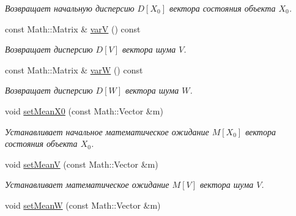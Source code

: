 \begin{DoxyCompactItemize}
\begin{DoxyCompactList}\small\item\em Возвращает начальную дисперсию $D[X_0]$ вектора состояния объекта $X_0$. \end{DoxyCompactList}\item 
\hypertarget{class_core_1_1_task_ae1f2edae174e815a622182cf82df68e6}{}\label{class_core_1_1_task_ae1f2edae174e815a622182cf82df68e6} 
const Math\+::\+Matrix \& \hyperlink{class_core_1_1_task_ae1f2edae174e815a622182cf82df68e6}{varV} () const
\begin{DoxyCompactList}\small\item\em Возвращает дисперсию $D[V]$ вектора шума $V$. \end{DoxyCompactList}\item 
\hypertarget{class_core_1_1_task_a5470510a5879a73ddde3f78ffeefe76f}{}\label{class_core_1_1_task_a5470510a5879a73ddde3f78ffeefe76f} 
const Math\+::\+Matrix \& \hyperlink{class_core_1_1_task_a5470510a5879a73ddde3f78ffeefe76f}{varW} () const
\begin{DoxyCompactList}\small\item\em Возвращает дисперсию $D[W]$ вектора шума $W$. \end{DoxyCompactList}\item 
\hypertarget{class_core_1_1_task_afdd5722479df7ff461d797b1b51ee9bf}{}\label{class_core_1_1_task_afdd5722479df7ff461d797b1b51ee9bf} 
void \hyperlink{class_core_1_1_task_afdd5722479df7ff461d797b1b51ee9bf}{set\+Mean\+X0} (const Math\+::\+Vector \&m)
\begin{DoxyCompactList}\small\item\em Устанавливает начальное математическое ожидание $M[X_0]$ вектора состояния объекта $X_0$. \end{DoxyCompactList}\item 
\hypertarget{class_core_1_1_task_abb608e7039dcf6058b1e6146ea51f87c}{}\label{class_core_1_1_task_abb608e7039dcf6058b1e6146ea51f87c} 
void \hyperlink{class_core_1_1_task_abb608e7039dcf6058b1e6146ea51f87c}{set\+MeanV} (const Math\+::\+Vector \&m)
\begin{DoxyCompactList}\small\item\em Устанавливает математическое ожидание $M[V]$ вектора шума $V$. \end{DoxyCompactList}\item 
\hypertarget{class_core_1_1_task_aaf2c30082db74d2643ed382a92d3faf0}{}\label{class_core_1_1_task_aaf2c30082db74d2643ed382a92d3faf0} 
void \hyperlink{class_core_1_1_task_aaf2c30082db74d2643ed382a92d3faf0}{set\+MeanW} (const Math\+::\+Vector \&m)

\end{DoxyCompactItemize}
